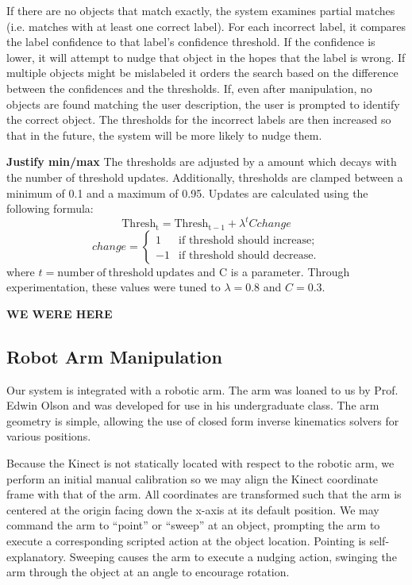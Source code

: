 \documentclass[11pt]{article}
\newcommand{\xxx}[1]{{\bf \color{red} #1}}
\newcommand{\meh}[1]{{\bf \color{blue} #1}}
\begin{document}
If there are no objects that match exactly, the system examines partial
matches (i.e. matches with at least one correct label). For each incorrect label, it compares the
label confidence to that label's confidence threshold. If the confidence is
lower, it will attempt to nudge that object in the hopes that the label
is wrong. If multiple objects might be mislabeled it orders the search
based on the difference between the confidences and the thresholds. If, even after
manipulation, no objects are found matching the user description, the user is
prompted to identify the correct object. The thresholds for the incorrect
labels are then increased so that in the future, the system will be more
likely to nudge them.

\xxx{Justify min/max}
The thresholds are adjusted by a amount which decays with the number of
threshold updates. Additionally, thresholds are clamped between a minimum of
0.1 and a maximum of 0.95. Updates are calculated using the following formula:
$$\mathrm{Thresh_{t}} = \mathrm{Thresh_{t-1}} + \lambda^t C change$$
\[change = \left\{ \begin{array}{ll}
         1 & \mbox{if threshold should increase};\\
         -1 & \mbox{if threshold should decrease}.\end{array} \right. \]
where $t= \mathrm{number~of~threshold~updates}$ and C is a parameter. Through
experimentation, these values were tuned to $\lambda = 0.8$ and $C = 0.3$.

\meh{WE WERE HERE}
\subsection{Robot Arm Manipulation}
Our system is integrated with a robotic arm. The arm was loaned to us by Prof.
Edwin Olson and was developed for use in his undergraduate class. The arm
geometry is simple, allowing the use of closed form inverse kinematics solvers
for various positions.

Because the Kinect is not statically located with respect to the robotic arm,
we perform an initial manual calibration so we may align the Kinect coordinate
frame with that of the arm. All coordinates are transformed such that the arm
is centered at the origin facing down the x-axis at its default position. We
may command the arm to ``point'' or ``sweep'' at an object, prompting the arm
to execute a corresponding scripted action at the object location. Pointing is
self-explanatory. Sweeping causes the arm to execute a nudging action,
swinging the arm through the object at an angle to encourage rotation.
\end{document}
